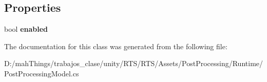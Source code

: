 \subsection*{Properties}
\begin{DoxyCompactItemize}
\item 
\mbox{\label{class_unity_engine_1_1_post_processing_1_1_post_processing_model_a94ada6da8010b232e32ff65d667db6a3}} 
bool {\bfseries enabled}
\end{DoxyCompactItemize}


The documentation for this class was generated from the following file\+:\begin{DoxyCompactItemize}
\item 
D\+:/mah\+Things/trabajos\+\_\+clase/unity/\+R\+T\+S/\+R\+T\+S/\+Assets/\+Post\+Processing/\+Runtime/Post\+Processing\+Model.\+cs\end{DoxyCompactItemize}
